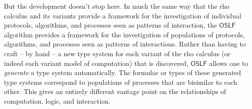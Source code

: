 But the development doesn't stop here. In much the same way that the
rho calculus and its variants provide a framework for the
investigation of individual protocols, algorithms, and processes seen
as patterns of interaction, the $\mathsf{OSLF}$ algorithm provides a
framework for the investigation of populations of protocols,
algorithms, and processes seen as patterns of interactions. Rather
than having to craft -- by hand -- a new type system for each variant
of the rho calculus (or indeed each variant model of computation) that
is discovered, $\mathsf{OSLF}$ allows one to \emph{generate} a type
system automatically. The formulae or types of these generated type
systems correspond to populations of processes that are bisimilar to
each other. This gives an entirely different vantage point on the
relationships of computation, logic, and interaction.



